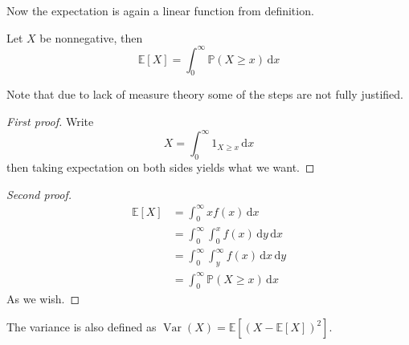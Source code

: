 Now the expectation is again a linear function from definition.
\begin{proposition}
    Let $X$ be nonnegative, then
    $$\mathbb E[X]=\int_0^\infty\mathbb P(X\ge x)\,\mathrm dx$$
\end{proposition}
Note that due to lack of measure theory some of the steps are not fully justified.
\begin{proof}[First proof]
    Write
    $$X=\int_0^\infty 1_{X\ge x}\,\mathrm dx$$
    then taking expectation on both sides yields what we want.
\end{proof}
\begin{proof}[Second proof]
    \begin{align*}
        \mathbb E[X]&=\int_0^\infty xf(x)\,\mathrm dx\\
        &=\int_0^\infty \int_0^xf(x)\,\mathrm dy\,\mathrm dx\\
        &=\int_0^\infty\int_y^\infty f(x)\,\mathrm dx\,\mathrm dy\\
        &=\int_0^\infty\mathbb P(X\ge x)\,\mathrm dx
    \end{align*}
    As we wish.
\end{proof}
\begin{definition}
    The variance is also defined as $\operatorname{Var}(X)=\mathbb E[(X-\mathbb E[X])^2]$.
\end{definition}
